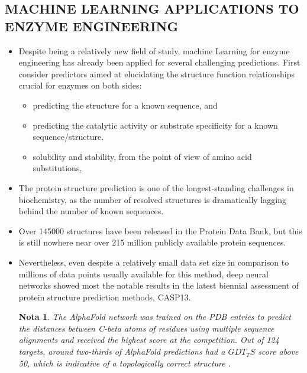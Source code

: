 \documentclass[12pt]{article}
\newtheorem{Note}{Nota}%
\begin{document}
\subsection{MACHINE LEARNING APPLICATIONS TO ENZYME ENGINEERING}

\begin{itemize}

\item Despite being a relatively new ﬁeld of study, machine Learning for enzyme engineering has already been applied for several challenging predictions. First consider predictors aimed at elucidating the structure function relationships crucial for enzymes on both sides:

\begin{itemize}
\item predicting the structure for a known sequence, and 
\item predicting the catalytic activity or substrate speciﬁcity for a known sequence/structure. 
\item solubility and stability, from the point of view of amino acid substitutions,

\end{itemize}

\item The protein structure prediction is one of the longest-standing challenges in biochemistry, as the number of resolved structures is dramatically lagging behind the number of known sequences.

\item Over 145000 structures have been released in the Protein Data Bank, but this is still nowhere near over 215 million publicly available protein sequences\cite{28}. 

\item Nevertheless, even despite a relatively small data set size in comparison to millions of data points usually available for this method, deep neural networks showed most the notable results in the latest biennial assessment of protein structure prediction methods, CASP13. 

\begin{Note}
The AlphaFold network was trained on the PDB entries to predict the distances between C-beta atoms of residues using multiple sequence alignments\cite{60} and received the highest score at the competition. Out of 124 targets, around two-thirds of AlphaFold predictions had a $GDT_TS$ score above 50, which is indicative of a topologically correct structure \cite{61}.
\end{Note}


\end{itemize}
\end{document}
